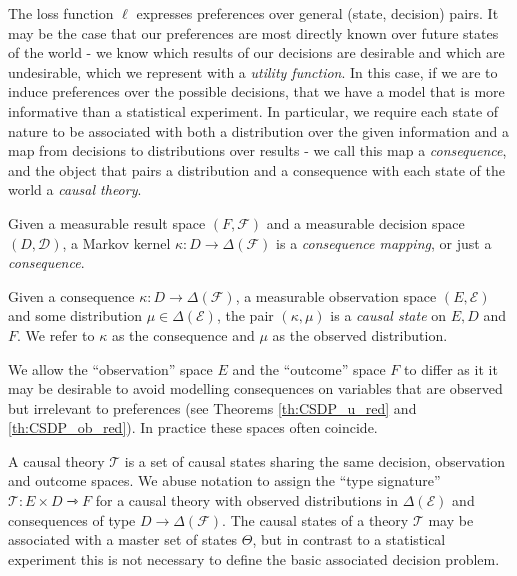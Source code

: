 The loss function $\ell$ expresses preferences over general (state, decision) pairs. It may be the case that our preferences are most directly known over future states of the world - we know which results of our decisions are desirable and which are undesirable, which we represent with a \emph{utility function}. In this case, if we are to induce preferences over the possible decisions, that we have a model that is more informative than a statistical experiment. In particular, we require each state of nature to be associated with both a distribution over the given information and a map from decisions to distributions over results - we call this map a \emph{consequence}, and the object that pairs a distribution and a consequence with each state of the world a \emph{causal theory}.

\begin{definition}[Consequences]
Given a measurable result space $(F,\mathcal{F})$ and a measurable decision space $(D,\mathcal{D})$, a Markov kernel $\kappa:D \to \Delta(\mathcal{F})$ is a \emph{consequence mapping}, or just a \emph{consequence}.
\end{definition}

\begin{definition}
Given a consequence $\kappa:D\to \Delta(\mathcal{F})$, a measurable observation space $(E,\mathcal{E})$ and some distribution $\mu\in \Delta(\mathcal{E})$, the pair $(\kappa,\mu)$ is a \emph{causal state} on $E, D$ and $F$. We refer to $\kappa$ as the consequence and $\mu$ as the observed distribution.
\end{definition}

We allow the ``observation'' space $E$ and the ``outcome'' space $F$ to differ as it it may be desirable to avoid modelling consequences on variables that are observed but irrelevant to preferences (see Theorems \ref{th:CSDP_u_red} and \ref{th:CSDP_ob_red}). In practice these spaces often coincide.

\begin{definition}\label{def:causal_theory}
A causal theory $\mathscr{T}$ is a set of causal states sharing the same decision, observation and outcome spaces. We abuse notation to assign the ``type signature'' $\mathscr{T}:E\times D\rightarrowtriangle F$ for a causal theory with observed distributions in $\Delta(\mathcal{E})$ and consequences of type $D\to \Delta(\mathcal{F})$. The causal states of a theory $\mathscr{T}$ may be associated with a master set of states $\Theta$, but in contrast to a statistical experiment this is not necessary to define the basic associated decision problem.
\end{definition}

